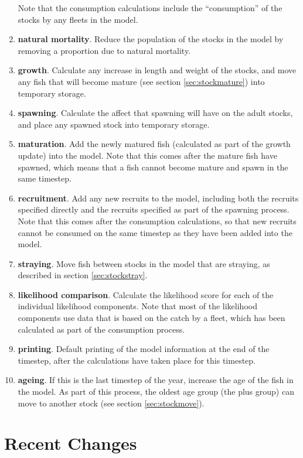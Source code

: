 \documentclass[]{book}
\begin{document}
\begin{enumerate}
  Note that the consumption calculations include the ``consumption'' of
  the stocks by any fleets in the model.
\item
  \textbf{natural mortality}. Reduce the population of the stocks in the
  model by removing a proportion due to natural mortality.
\item
  \textbf{growth}. Calculate any increase in length and weight of the
  stocks, and move any fish that will become mature (see
  section \ref{sec:stockmature}) into temporary storage.
\item
  \textbf{spawning}. Calculate the affect that spawning will have on the
  adult stocks, and place any spawned stock into temporary storage.
\item
  \textbf{maturation}. Add the newly matured fish (calculated as part of
  the growth update) into the model. Note that this comes after the
  mature fish have spawned, which means that a fish cannot become
  mature and spawn in the same timestep.
\item
  \textbf{recruitment}. Add any new recruits to the model, including both
  the recruits specified directly and the recruits specified as part
  of the spawning process. Note that this comes after the consumption
  calculations, so that new recruits cannot be consumed on the same
  timestep as they have been added into the model.
\item
  \textbf{straying}. Move fish between stocks in the model that are
  straying, as described in
  section \ref{sec:stockstray}.
\item
  \textbf{likelihood comparison}. Calculate the likelihood score for each
  of the individual likelihood components. Note that most of the
  likelihood components use data that is based on the catch by a
  fleet, which has been calculated as part of the consumption process.
\item
  \textbf{printing}. Default printing of the model information at the end
  of the timestep, after the calculations have taken place for this
  timestep.
\item
  \textbf{ageing}. If this is the last timestep of the year, increase the
  age of the fish in the model. As part of this process, the oldest
  age group (the plus group) can move to another stock (see
  section \ref{sec:stockmove}).
\end{enumerate}

\hypertarget{chap:change}{%
\chapter{Recent Changes}\label{chap:change}}
\end{document}
